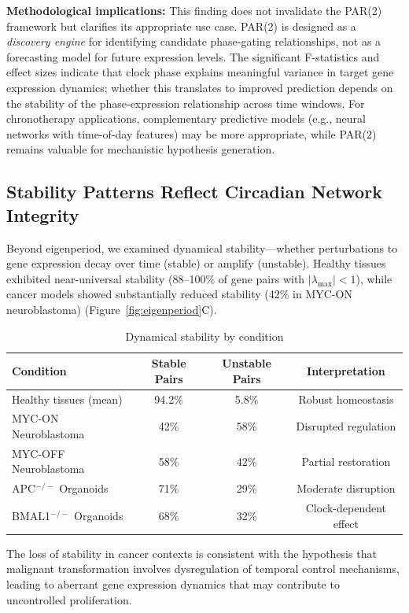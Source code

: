 \documentclass[11pt,a4paper]{article}
\begin{document}
\textbf{Methodological implications:} This finding does not invalidate the PAR(2) framework but clarifies its appropriate use case. PAR(2) is designed as a \textit{discovery engine} for identifying candidate phase-gating relationships, not as a forecasting model for future expression levels. The significant F-statistics and effect sizes indicate that clock phase explains meaningful variance in target gene expression dynamics; whether this translates to improved prediction depends on the stability of the phase-expression relationship across time windows. For chronotherapy applications, complementary predictive models (e.g., neural networks with time-of-day features) may be more appropriate, while PAR(2) remains valuable for mechanistic hypothesis generation.

\subsection{Stability Patterns Reflect Circadian Network Integrity}

Beyond eigenperiod, we examined dynamical stability---whether perturbations to gene expression decay over time (stable) or amplify (unstable). Healthy tissues exhibited near-universal stability (88--100\% of gene pairs with $|\lambda_{\max}| < 1$), while cancer models showed substantially reduced stability (42\% in MYC-ON neuroblastoma) (Figure~\ref{fig:eigenperiod}C).

\begin{table}[H]
\centering
\caption{Dynamical stability by condition}
\label{tab:stability}
\begin{tabular}{lccc}
\toprule
Condition & Stable Pairs & Unstable Pairs & Interpretation \\
\midrule
Healthy tissues (mean) & 94.2\% & 5.8\% & Robust homeostasis \\
MYC-ON Neuroblastoma & 42\% & 58\% & Disrupted regulation \\
MYC-OFF Neuroblastoma & 58\% & 42\% & Partial restoration \\
APC$^{-/-}$ Organoids & 71\% & 29\% & Moderate disruption \\
BMAL1$^{-/-}$ Organoids & 68\% & 32\% & Clock-dependent effect \\
\bottomrule
\end{tabular}
\end{table}

The loss of stability in cancer contexts is consistent with the hypothesis that malignant transformation involves dysregulation of temporal control mechanisms, leading to aberrant gene expression dynamics that may contribute to uncontrolled proliferation.
\end{document}
